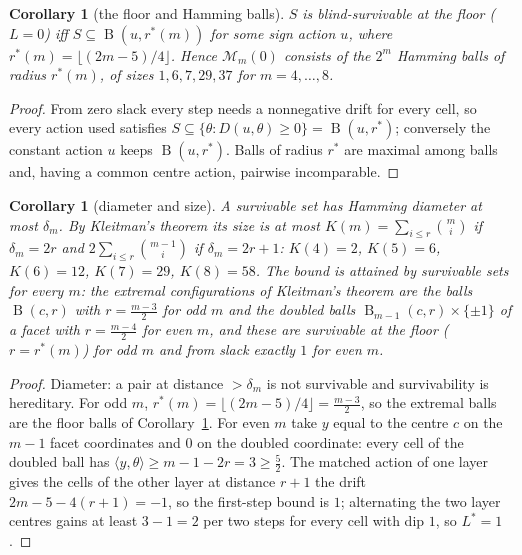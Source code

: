\documentclass[11pt,a4paper]{article}
\theoremstyle{plain}
\newtheorem{corollary}[theorem]{Corollary}
\theoremstyle{definition}
\theoremstyle{remark}
\newcommand{\calM}{\mathcal{M}}
\newcommand{\Ball}{\operatorname{B}}
\newcommand{\tfr}[2]{\tfrac{#1}{#2}}
\newcommand{\Lstar}{L^{\ast}}
\begin{document}
\begin{corollary}[the floor and Hamming balls]\label{cor:balls}
$S$ is blind-survivable at the floor ($L=0$) iff $S\subseteq\Ball(u,r^\ast(m))$ for some sign action $u$, where $r^\ast(m)=\lfloor(2m-5)/4\rfloor$. Hence $\calM_m(0)$ consists of the $2^m$ Hamming balls of radius $r^\ast(m)$, of sizes $1,6,7,29,37$ for $m=4,\dots,8$.
\end{corollary}
\begin{proof}
From zero slack every step needs a nonnegative drift for every cell, so every action used satisfies $S\subseteq\{\theta:D(u,\theta)\ge0\}=\Ball(u,r^\ast)$; conversely the constant action $u$ keeps $\Ball(u,r^\ast)$. Balls of radius $r^\ast$ are maximal among balls and, having a common centre action, pairwise incomparable.
\end{proof}

\begin{corollary}[diameter and size]\label{cor:kleitman}
A survivable set has Hamming diameter at most $\delta_m$. By Kleitman's theorem \cite{Kleitman1966} its size is at most $K(m)=\sum_{i\le r}\binom mi$ if $\delta_m=2r$ and $2\sum_{i\le r}\binom{m-1}i$ if $\delta_m=2r+1$: $K(4)=2$, $K(5)=6$, $K(6)=12$, $K(7)=29$, $K(8)=58$. The bound is attained by survivable sets for every $m$: the extremal configurations of Kleitman's theorem are the balls $\Ball(c,r)$ with $r=\tfr{m-3}2$ for odd $m$ and the doubled balls $\Ball_{m-1}(c,r)\times\{\pm1\}$ of a facet with $r=\tfr{m-4}2$ for even $m$, and these are survivable at the floor ($r=r^\ast(m)$) for odd $m$ and from slack exactly $1$ for even $m$.
\end{corollary}
\begin{proof}
Diameter: a pair at distance $>\delta_m$ is not survivable and survivability is hereditary. For odd $m$, $r^\ast(m)=\lfloor(2m-5)/4\rfloor=\tfr{m-3}2$, so the extremal balls are the floor balls of Corollary~\ref{cor:balls}. For even $m$ take $y$ equal to the centre $c$ on the $m-1$ facet coordinates and $0$ on the doubled coordinate: every cell of the doubled ball has $\langle y,\theta\rangle\ge m-1-2r=3\ge\tfr52$. The matched action of one layer gives the cells of the other layer at distance $r+1$ the drift $2m-5-4(r+1)=-1$, so the first-step bound is $1$; alternating the two layer centres gains at least $3-1=2$ per two steps for every cell with dip $1$, so $\Lstar=1$.
\end{proof}
\end{document}
